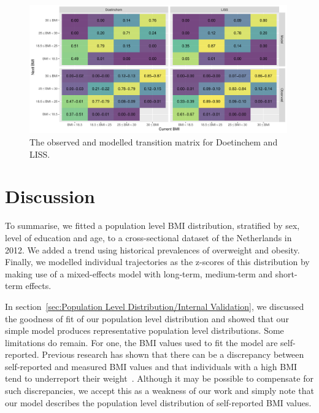 \documentclass{imammb}
\numberwithin{equation}{section}
\begin{document}
\begin{figure}[!h]
\centering\includegraphics[width=0.99\textwidth] {"Figures/Transition Matrices.pdf"}
\caption{The observed and modelled transition matrix for Doetinchem and LISS.}
\label{fig:Transition Matrices}
\vspace*{-9pt}
\end{figure}

\section{Discussion}
\label{sec:Discussion}

To summarise, we fitted a population level BMI distribution, stratified by sex, level of education and age, to a cross-sectional dataset of the Netherlands in 2012. We added a trend using historical prevalences of overweight and obesity. Finally, we modelled individual trajectories as the z-scores of this distribution by making use of a mixed-effects model with long-term, medium-term and short-term effects.

In section~\ref{sec:Population Level Distribution/Internal Validation}, we discussed the goodness of fit of our population level distribution and showed that our simple model produces representative population level distributions. Some limitations do remain. For one, the BMI values used to fit the model are self-reported. Previous research has shown that there can be a discrepancy between self-reported and measured BMI values and that individuals with a high BMI tend to underreport their weight~\citep{Olfert2018}. Although it may be possible to compensate for such discrepancies, we accept this as a weakness of our work and simply note that our model describes the population level distribution of self-reported BMI values.
\end{document}
